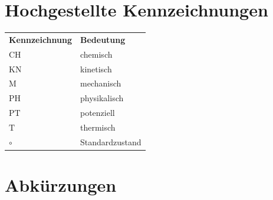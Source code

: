 \section*{Hochgestellte Kennzeichnungen}

\begin{longtable}{p{3cm}p{11cm}}
\textbf{Kennzeichnung} & \textbf{Bedeutung} \\
\addlinespace[0.5em]
$\mathrm{CH}$ & chemisch \\
$\mathrm{KN}$ & kinetisch \\
$\mathrm{M}$ & mechanisch \\
$\mathrm{PH}$ & physikalisch \\
$\mathrm{PT}$ & potenziell \\
$\mathrm{T}$ & thermisch \\
$\circ$ & Standardzustand \\
\end{longtable}

\section*{Abkürzungen}

